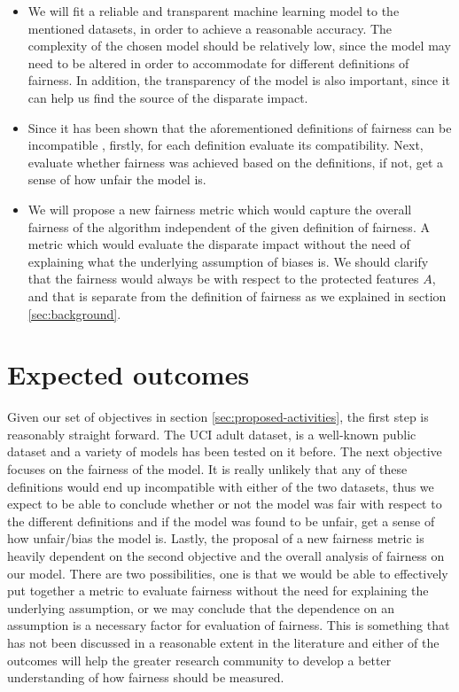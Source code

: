 \documentclass[11pt]{article}
\begin{document}
\begin{itemize}
 \item We will fit a reliable and transparent machine learning model to the mentioned datasets, in order to achieve a reasonable accuracy. The complexity of the chosen model should be relatively low, since the model may need to be altered in order to accommodate for different definitions of fairness. In addition, the transparency of the model is also important, since it can help us find the source of the disparate impact.
 
 \item Since it has been shown that the aforementioned definitions of fairness can be incompatible \cite{berk2017fairness, chouldechova2017fair}, firstly, for each definition evaluate its compatibility. Next, evaluate whether fairness was achieved based on the definitions, if not, get a sense of how unfair the model is.
 
 \item We will propose a new fairness metric which would capture the overall fairness of the algorithm independent of the given definition of fairness. A metric which would evaluate the disparate impact without the need of explaining what the underlying assumption of biases is. We should clarify that the fairness would always be with respect to the protected features $A$, and that is separate from the definition of fairness as we explained in section \ref{sec:background}.
\end{itemize}

\section{Expected outcomes}
Given our set of objectives in section \ref{sec:proposed-activities}, the first step is reasonably straight forward. The UCI adult dataset, is a well-known public dataset and a variety of models has been tested on it before. The next objective focuses on the fairness of the model. It is really unlikely that any of these definitions would end up incompatible with either of the two datasets, thus we expect to be able to conclude whether or not the model was fair with respect to the different definitions and if the model was found to be unfair, get a sense of how unfair/bias the model is. Lastly, the proposal of a new fairness metric is heavily dependent on the second objective and the overall analysis of fairness on our model. There are two possibilities, one is that we would be able to effectively put together a metric to evaluate fairness without the need for explaining the underlying assumption, or we may conclude that the dependence on an assumption is a necessary factor for evaluation of fairness. This is something that has not been discussed in a reasonable extent in the literature and either of the outcomes will help the greater research community to develop a better understanding of how fairness should be measured.


 
\end{document}
